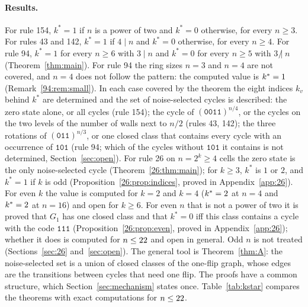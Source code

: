 \documentclass[10pt,a4paper]{article}
\newcommand{\Gone}{G_1}                       %
\newcommand{\kst}{k^{*}}
\newcommand{\code}[1]{\mathtt{#1}}            %
\newcommand{\ndiv}{\mathrel{\not|}}           %
\begin{document}
\paragraph{Results.}
For rule 154, $\kst=1$ if $n$ is a power of two and $\kst=0$ otherwise, for every $n\ge3$. For rules 43 and 142,
$\kst=1$ if $4\mid n$ and $\kst=0$ otherwise, for every $n\ge4$. For rule 94, $\kst=1$ for every $n\ge6$ with
$3\mid n$ and $\kst=0$ for every $n\ge5$ with $3\ndiv n$ (Theorem~\ref{thm:main}). For rule 94 the ring sizes $n=3$
and $n=4$ are not covered, and $n=4$ does not follow the pattern: the computed value is
$\kst=\KstarNinetyFourAtFour$ (Remark~\ref{94:rem:small}). In each case covered by the theorem the eight indices
$k_v$ behind $\kst$ are determined and the set of noise-selected cycles is described: the zero state alone, or all cycles
(rule 154); the cycle of $(\code{0011})^{n/4}$, or the cycles on the two levels of the number of walls next to $n/2$
(rules 43, 142); the three rotations of $(\code{011})^{n/3}$, or one closed class that contains every cycle with an
occurrence of $\code{101}$ (rule 94; which of the cycles without $\code{101}$ it contains is not determined,
Section~\ref{sec:open}). For rule 26 on $n=2^k\ge4$ cells the zero state is the only noise-selected
cycle (Theorem~\ref{26:thm:main}); for $k\ge3$, $\kst$ is $1$ or $2$, and $\kst=1$ if $k$ is odd
(Proposition~\ref{26:prop:indices}, proved in Appendix~\ref{app:26}). For even $k$ the value is computed for $k=2$
and $k=4$ ($\kst=\KstarTwentySixAtFour$ at $n=4$ and $\kst=\KstarTwentySixAtSixteen$ at $n=16$) and open for
$k\ge6$. For even $n$ that
is not a power of two it is proved that $\Gone$ has one closed class and that $\kst=0$ iff this class contains a cycle
with the code $\code{111}$ (Proposition~\ref{26:prop:even}, proved in Appendix~\ref{app:26}); whether it does is
computed for $n\le22$ and open in general. Odd $n$ is not treated
(Sections~\ref{sec:26} and~\ref{sec:open}). The general tool is Theorem~\ref{thm:A}: the noise-selected set is a
union of closed classes of the one-flip graph, whose edges are the transitions between cycles that need one flip.
The proofs have a common structure, which Section~\ref{sec:mechanism} states once. Table~\ref{tab:kstar} compares
the theorems with exact computations for $n\le22$.
\end{document}
